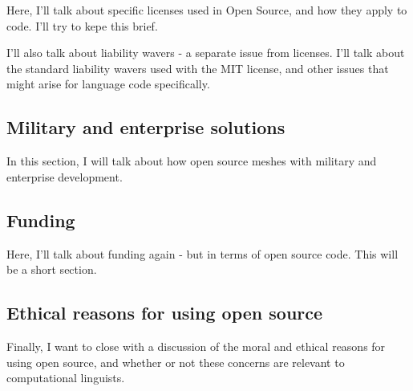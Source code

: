 Here, I'll talk about specific licenses used in Open Source, and how they apply to code. I'll try to kepe this brief.

I'll also talk about liability wavers - a separate issue from licenses. I'll talk about the standard liability wavers used with the MIT license, and other issues that might arise for language code specifically.

\subsection{Military and enterprise solutions}

In this section, I will talk about how open source meshes with military and enterprise development.

\subsection{Funding}

Here, I'll talk about funding again - but in terms of open source code. This will be a short section.




\subsection{Ethical reasons for using open source}

Finally, I want to close with a discussion of the moral and ethical reasons for using open source, and whether or not these concerns are relevant to computational linguists.
